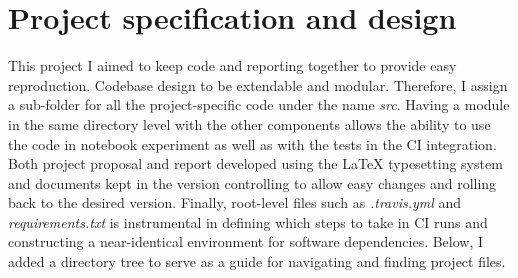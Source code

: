 \section{Project specification and design} \label{sec:projectlayout}
This project I aimed to keep code and reporting together to provide easy reproduction. Codebase design to be extendable and modular. Therefore, I assign a sub-folder for all the project-specific code under the name \emph{src}. Having a module in the same directory level with the other components allows the ability to use the code in notebook experiment as well as with the tests in the CI integration.
Both project proposal and report developed using the LaTeX typesetting system and documents kept in the version controlling to allow easy changes and rolling back to the desired version. Finally, root-level files such as \emph{.travis.yml} and \emph{requirements.txt} is instrumental in defining which steps to take in CI runs and constructing a near-identical environment for software dependencies.
Below, I added a directory tree to serve as a guide for navigating and finding project files.


